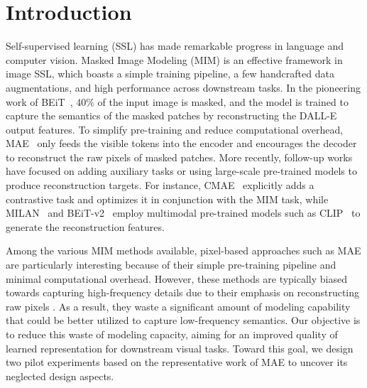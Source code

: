 \section{Introduction}
\label{sec:intro}
Self-supervised learning (SSL) has made remarkable progress in language and computer vision. Masked Image Modeling (MIM) is an effective framework in image SSL, which boasts a simple training pipeline, a few handcrafted data augmentations, and high performance across downstream tasks. In the pioneering work of BEiT~\cite{BEiT}, 40\% of the input image is masked, and the model is trained to capture the semantics of the masked patches by reconstructing the DALL-E~\cite{DALLE} output features. To simplify pre-training and reduce computational overhead, MAE~\cite{MAE} only feeds the visible tokens into the encoder and encourages the decoder to reconstruct the raw pixels of masked patches. More recently, follow-up works have focused on adding auxiliary tasks or using large-scale pre-trained models to produce reconstruction targets. For instance, CMAE~\cite{CMAE} explicitly adds a contrastive task and optimizes it in conjunction with the MIM task, while MILAN~\cite{MILAN} and BEiT-v2~\cite{BEiTv2} employ multimodal pre-trained models such as CLIP~\cite{CLIP} to generate the reconstruction features. 

Among the various MIM methods available, pixel-based approaches such as MAE \cite{MAE} are particularly interesting because of their simple pre-training pipeline and minimal computational overhead. However, these methods are typically biased towards capturing high-frequency details due to their emphasis on reconstructing raw pixels \cite{BEiT, pixmim}. As a result, they waste a significant amount of modeling capability that could be better utilized to capture low-frequency semantics. Our objective is to reduce this waste of modeling capacity, aiming for an improved quality of learned representation for downstream visual tasks. Toward this goal, we design two pilot experiments based on the representative work of MAE \cite{MAE} to uncover its neglected design aspects.

